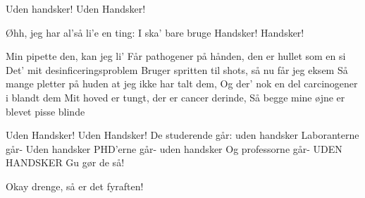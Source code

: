 \documentclass[a4paper,11pt]{article}
\begin{document}
\begin{song}
  Uden handsker! Uden Handsker!

  Øhh, jeg har al'så li'e en ting: I ska' bare bruge Handsker! Handsker!

  Min pipette den, kan jeg li’
  Får pathogener på hånden, den er hullet som en si
  Det’ mit desinficeringsproblem
  Bruger spritten til shots, så nu får jeg eksem
  Så mange pletter på huden at jeg ikke har talt dem,
  Og der’ nok en del carcinogener i blandt dem
  Mit hoved er tungt, der er cancer derinde,
  Så begge mine øjne er blevet pisse blinde

  Uden Handsker! Uden Handsker!
  De studerende går: uden handsker
  Laboranterne går- Uden handsker
  PHD'erne går- uden handsker
  Og professorne går- UDEN HANDSKER
  Gu gør de så!

   Okay drenge, så er det fyraften!

\end{song}
\end{document}

